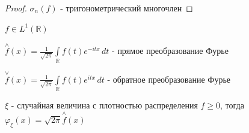 \begin{proof}
    $\sigma_n (f)$ - тригонометрический многочлен
\end{proof}


\begin{definition}
    $f \in L^1 (\mathbb{R})$

    $\overset{\wedge}{f} (x) = \frac{1}{\sqrt{2\pi}} \int\limits_{\mathbb{R}} f(t) e^{-itx} \, dt$ - прямое преобразование Фурье

    $\overset{\vee}{f} (x) = \frac{1}{\sqrt{2\pi}} \int\limits_{\mathbb{R}} f(t) e^{itx} \, dt$ - обратное преобразование Фурье

\end{definition}

\begin{remark}
    $\xi$ - случайная величина с плотностью распределения $f \geqslant 0$, тогда $\varphi_\xi (x) = \sqrt{2\pi} \overset{\wedge}{f} (x) $
\end{remark}

